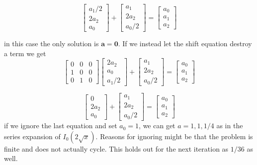 \documentclass{article}
\begin{document}
$$
\begin{bmatrix}
a_1/2 \\ 2a_2 \\ a_0
\end{bmatrix} + \begin{bmatrix}
a_1 \\ 2 a_2 \\ a_0/2
\end{bmatrix}=\begin{bmatrix}
a_0 \\ a_1 \\ a_2
\end{bmatrix}
$$

in this case the only solution is $\mathbf{a}=\mathbf{0}$. If we instead let the shift equation destroy a term we get
$$
\begin{bmatrix}
0 & 0 & 0 \\ 1 & 0 & 0 \\ 0 & 1 & 0
\end{bmatrix}    \begin{bmatrix}
2 a_2 \\ a_0 \\ a_1/2
\end{bmatrix} + \begin{bmatrix}
a_1 \\ 2 a_2 \\ a_0/2
\end{bmatrix}=\begin{bmatrix}
a_0 \\ a_1 \\ a_2
\end{bmatrix}
$$

$$
\begin{bmatrix}
0 \\ 2 a_2 \\ a_0
\end{bmatrix} + \begin{bmatrix}
a_1 \\ 2 a_2 \\ a_0/2
\end{bmatrix}=\begin{bmatrix}
a_0 \\ a_1 \\ a_2
\end{bmatrix}
$$
if we ignore the last equation and set $a_0=1$, we can get $a = 1,1,1/4$ as in the series expansion of $I_0(2 \sqrt{x})$. Reasons for ignoring might be that the problem is finite and does not actually cycle. This holds out for the next iteration as $1/36$ as well. 
\end{document}
